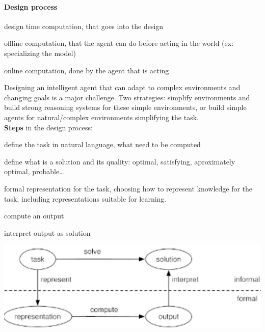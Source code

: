 \documentclass[10pt]{report}
\begin{document}
\paragraph{Design process}
\begin{list}{}{}
	\item design time computation, that goes into the design
	\item offline computation, that the agent can do before acting in the world (ex: specializing the model)
	\item online computation, done by the agent that is acting
\end{list}
Designing an intelligent agent that can adapt to complex environments and changing goals is a major challenge. Two strategies: simplify environments and build strong reasoning systems for these simple environments, or build simple agents for natural/complex environments simplifying the task.\\
\textbf{Steps} in the design process:
\begin{list}{}{}
	\item define the task in natural language, what need to be computed
	\item define what is a solution and its quality: optimal, satisfying, aproximately optimal, probable\ldots
	\item formal representation for the task, choosing how to represent knowledge for the task, including representations suitable for learning.
	\item compute an output
	\item interpret output as solution
\end{list}
\begin{center}
	\includegraphics[scale=0.5]{2.png}
\end{center}
\end{document}

